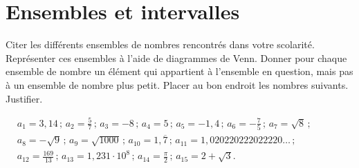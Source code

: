 \documentclass[a4paper,12pt]{article}
\begin{document}
\section{Ensembles et intervalles}
\begin{activite}
	\tcblower
	\begin{tasks}
		\task Citer les différents ensembles de nombres rencontrés dans votre scolarité.
		\task Représenter ces ensembles à l'aide de diagrammes de Venn.
		\task Donner pour chaque ensemble de nombre un élément qui appartient à l'ensemble en question, mais pas à un ensemble de nombre plus petit.
		\task Placer au bon endroit les nombres suivants. Justifier.

$
\begin{aligned}
& a_1=3,14\,;\,a_2=\frac{5}{7}\,;\,a_3=-8\,;\,a_4=5\,;\,a_5=-1,4\,;\,a_6=-\frac{7}{5}\,;\,a_7=\sqrt{8}\,;\\
&a_8=-\sqrt{9}\,;\,a_9=\sqrt{1000}\,;\,
 a_{10}=1, \overline{7}\,;\,a_{11}=1,020220222022220 \ldots\,;\\
&a_{12}=\frac{169}{13}\,;\,a_{13}=1,231 \cdot 10^8\,;\,a_{14}=\frac{\pi}{2}\,;\,a_{15}=2+\sqrt{3} .
\end{aligned}$
	\end{tasks}
\end{activite}
\end{document}
